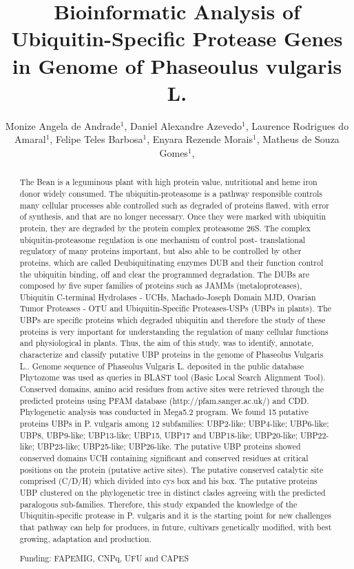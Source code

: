 \documentclass[twoside]{article}
\title{\vspace{-15mm}\fontsize{24pt}{10pt}\selectfont\textbf{ Bioinformatic Analysis of Ubiquitin-Specific Protease Genes in Genome of Phaseoulus vulgaris L. }} %
\author{ Monize Angela de Andrade$^{1}$, Daniel Alexandre Azevedo$^{1}$, Laurence Rodrigues do Amaral$^{1}$, Felipe Teles Barbosa$^{1}$, Enyara Rezende Morais$^{1}$, Matheus de Souza Gomes$^{1}$, }
\affil{ 1 UFMG

 }
\date{}
\begin{document}
  
  
  \maketitle %
  
  
  \thispagestyle{fancy} %
  
  
  \begin{abstract}
  The Bean is a leguminous plant with high protein value, nutritional and heme iron donor widely consumed. The ubiquitin-proteasome is a pathway responsible controls many cellular processes able controlled such as degraded of proteins flawed, with error of synthesis, and that are no longer necessary. Once they were marked with ubiquitin protein, they are degraded by the protein complex proteasome 26S. The complex ubiquitin-proteasome regulation is one mechanism of control post- translational regulatory of many proteins important, but also able to be controlled by other proteins, which are called Deubiquitinating enzymes DUB and their function control the ubiquitin binding, off and clear the programmed degradation. The DUBs are composed by five super families of proteins such as JAMMs (metaloproteases), Ubiquitin C-terminal Hydrolases - UCHs, Machado-Joseph Domain MJD, Ovarian Tumor Proteases - OTU and Ubiquitin-Specific Proteases-USPs (UBPs in plants). The UBPs are specific proteins which degraded ubiquitin and therefore the study of these proteins is very important for understanding the regulation of many cellular functions and physiological in plants. Thus, the aim of this study, was to identify, annotate, characterize and classify putative UBP proteins in the genome of Phaseolus Vulgaris L.. Genome sequence of Phaseolus Vulgaris L. deposited in the public database Phytozome was used as queries in BLAST tool (Basic Local Search Alignment Tool). Conserved domains, amino acid residues from active sites were retrieved through the predicted proteins using PFAM database (http://pfam.sanger.ac.uk/) and CDD. Phylogenetic analysis was conducted in Mega5.2 program. We found 15 putative proteins UBPs in P. vulgaris among 12 subfamilies: UBP2-like; UBP4-like; UBP6-like; UBP8, UBP9-like; UBP13-like; UBP15, UBP17 and UBP18-like; UBP20-like; UBP22-like; UBP23-like; UBP25-like; UBP26-like. The putative UBP proteins showed conserved domains UCH containing significant and conserved residues at critical positions on the protein (putative active sites). The putative conserved catalytic site comprised (C/D/H) which divided into cys box and his box. The putative proteins UBP clustered on the phylogenetic tree in distinct clades agreeing with the predicted paralogous sub-families. Therefore, this study expanded the knowledge of the Ubiquitin-specific protease in P. vulgaris and it is the starting point for new challenges that pathway can help for produces, in future, cultivars genetically modified, with best growing, adaptation and production.
  
  Funding: FAPEMIG, CNPq, UFU and CAPES \\ 
  \end{abstract}
  
\end{document}
